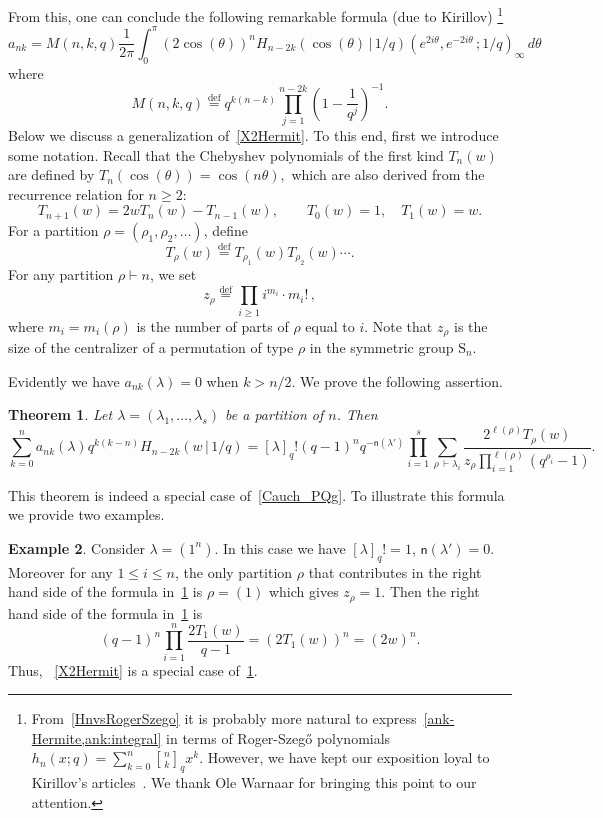 \documentclass[12pt,a4paper,reqno]{amsart}
\theoremstyle{plain}
\newtheorem{theorem}{Theorem}[section]
\theoremstyle{definition}
\newtheorem{example}[theorem]{Example}
\newcommand{\defin}{\overset{\mathrm{def}}{=}}
\newcommand{\1}{\mathds{1}}
\newcommand{\Hung}{\H}
\newcommand{\fn}{\mathsf{n}}
\begin{document}
From this, one can conclude the following remarkable formula (due to Kirillov)
\footnote{
From~\cref{HnvsRogerSzego} it is probably more natural to express~\cref{ank-Hermite,ank:integral} in terms of Roger-Szeg\Hung{o} polynomials $h_n(x;q)=\sum_{k=0}^n{n \brack k}_qx^k$. However, we have kept our exposition loyal to Kirillov's articles~\cite{KirillovX=0,Kirillov}. We thank Ole Warnaar for bringing this point to our attention.
}
\begin{equation}\label{ank-Hermite}
a_{nk}=M(n,k,q)\frac{1}{2\pi}\int_{0}^\pi ( 2\cos(\theta))^{n} H_{n-2k}(\cos(\theta)\, |\, 1/q)(e^{2i\theta},e^{-2i\theta}\, ;1/q)_{\infty}\, d\theta 
\end{equation}
where
\[
M({n,k,q})\defin
q^{k(n-k)}\prod_{j=1}^{n-2k}\left(1-\frac{1}{q^j}\right)^{-1}.
\]Below we discuss a generalization of~\cref{X2Hermit}. To this end, first we introduce some notation. Recall that the Chebyshev polynomials of the first kind $T_n(w)$ are defined by
$
T_n(\cos(\theta)) = \cos(n\theta),
$
which are also derived from the recurrence relation for $n \geq 2$:
\[
T_{n+1}(w) = 2wT_n(w) - T_{n-1}(w), \qquad T_0(w) = 1, \quad T_1(w) = w.
\]
For a partition $\rho = (\rho_1, \rho_2, \dots)$, define
\begin{equation}
\label{eq:Trho}
T_{\rho}(w) \defin T_{\rho_1}(w)T_{\rho_2}(w)\cdots .
\end{equation}
For any partition $\rho \vdash n$, we set
\begin{equation}\label{z_rho}
z_\rho \defin \prod_{i \geq 1} i^{m_i} \cdot m_i!\, ,
\end{equation}
where $m_i = m_i(\rho)$ is the number of parts of $\rho$ equal to $i$. Note that $z_\rho$ is the size of the centralizer of a permutation of type $\rho$ in the symmetric group $\mathrm{S}_n$. 

Evidently we have $a_{nk}(\lambda)=0$ when $k>n/2$. 
We prove the following assertion. 

\begin{theorem}\label{eq: Kirillov-general} Let $\lambda=(\lambda_1,\dots,\lambda_s)$ be a partition of $n$. Then
\begin{equation*}
\sum_{k=0}^n a_{nk}(\lambda)q^{k(k-n)}H_{n-2k}(w\,|\, 1/q)=[\lambda]_q! (q-1)^nq^{-\fn(\lambda')}\prod_{i=1}^s\sum_{\rho\, \vdash \lambda_i}\frac{2^{\ell(\rho)}T_{\rho}(w)}{z_\rho\prod_{i=1}^{\ell(\rho)}\left(q^{\rho_i}-1\right)}.
\end{equation*}
\end{theorem}
This theorem is indeed a special case of~\cref{Cauch_PQg}. To illustrate this formula we provide two examples.
\begin{example} Consider $\lambda=(1^n)$. In this case we have $[\lambda]_q!=1$, $\fn(\lambda')=0$.
Moreover for any $1\leq i\leq n$, the only partition $\rho$ that contributes in the right hand side of the formula in~\cref{eq: Kirillov-general}  is $\rho=(1)$ which gives $z_\rho=1$. Then the right hand side of the formula in~\cref{eq: Kirillov-general} is 
$$
(q-1)^n\prod_{i=1}^n\frac{2T_1(w)}{q-1}=(2T_1(w))^n=(2w)^n.
$$
Thus, ~\cref{X2Hermit} is a special case of~\cref{eq: Kirillov-general}.  
\end{example}
\end{document}
